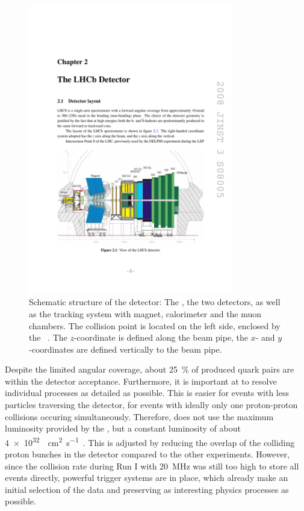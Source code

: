 \begin{figure}[tbp]
    \centering
    \includegraphics[width=0.8\textwidth]{05lhcb/figs/detector.pdf}
    \caption{Schematic structure of the \lhcb detector: The \velo, the two \rich detectors, as well as the tracking system with magnet, calorimeter and the muon chambers.
    The collision point is located on the left side, enclosed by the \velo~\cite{Alves:2008zz}.
    The $z$-coordinate is defined along the beam pipe, the $x$- and $y$-coordinates are defined vertically to the beam pipe.}
    \label{fig:lhcbdetector}
\end{figure}
Despite the limited angular coverage, about \SI{25}{\percent} of produced \bbbar quark pairs are within the detector acceptance.
Furthermore, it is important at \lhcb to resolve individual processes as detailed as possible.
This is easier for events with less particles traversing the detector, \ie for events with ideally only one proton-proton collisions occuring simultaneously.
Therefore, \lhcb does not use the maximum luminosity provided by the \lhc, but a constant luminosity of about \SI{4e32}{\per\cm\squared\per\second}~\cite{LHC_statistic}.
This is adjusted by reducing the overlap of the colliding proton bunches in the \lhcb detector compared to the other experiments.
However, since the collision rate during Run I with \SI{20}{\mega\hertz} was still too high to store all events directly, powerful trigger systems are in place, which already make an initial selection of the data and preserving as interesting physics processes as possible.


